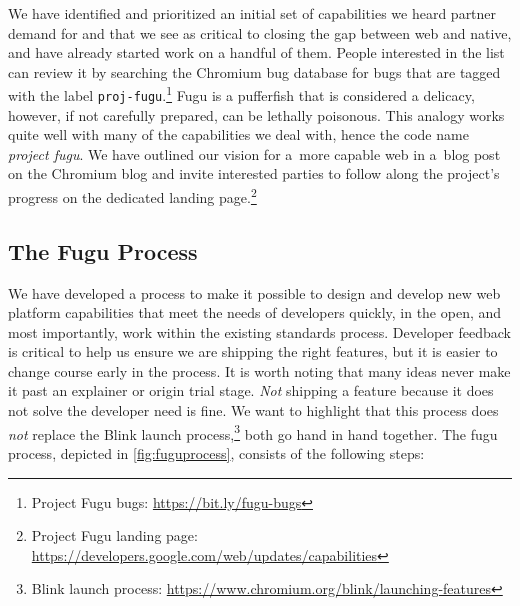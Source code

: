 \documentclass[sigconf, anonymous]{acmart}
\begin{document}
We have identified and prioritized an initial set of capabilities
we heard partner demand for and that we see as critical to closing the gap
between web and native, and have already started work on a handful of them.
People interested in the list can review it by searching the Chromium bug database
for bugs that are tagged with the label
\texttt{proj-fugu}.\footnote{Project Fugu bugs: \url{https://bit.ly/fugu-bugs}}
Fugu is a pufferfish that is considered a delicacy, however,  
if not carefully prepared, can be lethally poisonous. 
This analogy works quite well with many of the capabilities we deal with,
hence the code name \textit{project fugu}.
We have outlined our vision for a~more capable web in a~blog post~\cite{lepage18}
on the Chromium blog and invite interested parties to follow along the project's progress
on the dedicated landing
page.\footnote{Project Fugu landing page: \url{https://developers.google.com/web/updates/capabilities}}

\subsection{The Fugu Process}

We have developed a process to make it possible to design and develop
new web platform capabilities that meet the needs of developers quickly,
in the open, and most importantly, work within the existing standards process.
Developer feedback is critical to help us ensure we are shipping the right features,
but it is easier to change course early in the process.
It is worth noting that many ideas never make it past an explainer or origin trial stage.
\textit{Not} shipping a feature because it does not solve the developer need is fine.
We want to highlight that this process does \textit{not} replace the Blink launch
process,\footnote{Blink launch process: \url{https://www.chromium.org/blink/launching-features}}
both go hand in hand together.
The fugu process, depicted in \autoref{fig:fuguprocess}, consists of the following steps:
\end{document}
